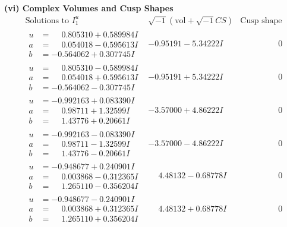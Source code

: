 \documentclass[1p]{elsarticle_modified}
\theoremstyle{definition}
\newcommand{\I}{\sqrt{-1}}
\begin{document}
\newpage\flushleft \textbf{(vi) Complex Volumes and Cusp Shapes}
$$\begin{array}{c|c|c}  
\text{Solutions to }I^u_{1}& \I (\text{vol} + \sqrt{-1}CS) & \text{Cusp shape}\\
 \hline 
\begin{aligned}
u &= \phantom{-}0.805310 + 0.589984 I \\
a &= \phantom{-}0.054018 - 0.595613 I \\
b &= -0.564062 + 0.307745 I\end{aligned}
 & -0.95191 - 5.34222 I & \phantom{-0.000000 } 0 \\ \hline\begin{aligned}
u &= \phantom{-}0.805310 - 0.589984 I \\
a &= \phantom{-}0.054018 + 0.595613 I \\
b &= -0.564062 - 0.307745 I\end{aligned}
 & -0.95191 + 5.34222 I & \phantom{-0.000000 } 0 \\ \hline\begin{aligned}
u &= -0.992163 + 0.083390 I \\
a &= \phantom{-}0.98711 + 1.32599 I \\
b &= \phantom{-}1.43776 + 0.20661 I\end{aligned}
 & -3.57000 + 4.86222 I & \phantom{-0.000000 } 0 \\ \hline\begin{aligned}
u &= -0.992163 - 0.083390 I \\
a &= \phantom{-}0.98711 - 1.32599 I \\
b &= \phantom{-}1.43776 - 0.20661 I\end{aligned}
 & -3.57000 - 4.86222 I & \phantom{-0.000000 } 0 \\ \hline\begin{aligned}
u &= -0.948677 + 0.240901 I \\
a &= \phantom{-}0.003868 - 0.312365 I \\
b &= \phantom{-}1.265110 - 0.356204 I\end{aligned}
 & \phantom{-}4.48132 - 0.68778 I & \phantom{-0.000000 } 0 \\ \hline\begin{aligned}
u &= -0.948677 - 0.240901 I \\
a &= \phantom{-}0.003868 + 0.312365 I \\
b &= \phantom{-}1.265110 + 0.356204 I\end{aligned}
 & \phantom{-}4.48132 + 0.68778 I & \phantom{-0.000000 } 0 \\ \hline\begin{aligned}

\end{aligned}
\end{array}$$
\end{document}
